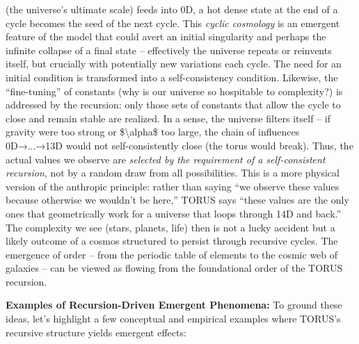 \begin{itemize}
  (the universe's ultimate scale) feeds into 0D, a hot dense state at
  the end of a cycle becomes the seed of the next cycle​. This
  \emph{cyclic cosmology} is an emergent feature of the model that could
  avert an initial singularity and perhaps the infinite collapse of a
  final state -- effectively the universe repeats or reinvents itself,
  but crucially with potentially new variations each cycle. The need for
  an initial condition is transformed into a self-consistency condition.
  Likewise, the ``fine-tuning'' of constants (why is our universe so
  hospitable to complexity?) is addressed by the recursion: only those
  sets of constants that allow the cycle to close and remain stable are
  realized​. In a sense, the universe filters itself -- if gravity were
  too strong or \$\textbackslash{}alpha\$ too large, the chain of
  influences 0D→...→13D would not self-consistently close (the torus
  would break). Thus, the actual values we observe are \emph{selected by
  the requirement of a self-consistent recursion}, not by a random draw
  from all possibilities​. This is a more physical version of the
  anthropic principle: rather than saying ``we observe these values
  because otherwise we wouldn't be here,'' TORUS says ``these values are
  the only ones that geometrically work for a universe that loops
  through 14D and back.'' The complexity we see (stars, planets, life)
  then is not a lucky accident but a likely outcome of a cosmos
  structured to persist through recursive cycles. The emergence of order
  -- from the periodic table of elements to the cosmic web of galaxies
  -- can be viewed as flowing from the foundational order of the TORUS
  recursion.
\end{itemize}

\textbf{Examples of Recursion-Driven Emergent Phenomena:} To ground
these ideas, let's highlight a few conceptual and empirical examples
where TORUS's recursive structure yields emergent effects:

